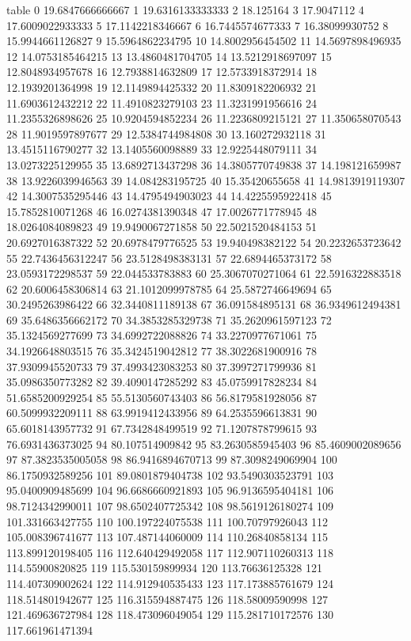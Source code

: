 table {%
0 19.6847666666667
1 19.6316133333333
2 18.125164
3 17.9047112
4 17.6009022933333
5 17.1142218346667
6 16.7445574677333
7 16.38099930752
8 15.9944661126827
9 15.5964862234795
10 14.8002956454502
11 14.5697898496935
12 14.0753185464215
13 13.4860481704705
14 13.5212918697097
15 12.8048934957678
16 12.7938814632809
17 12.5733918372914
18 12.1939201364998
19 12.1149894425332
20 11.8309182206932
21 11.6903612432212
22 11.4910823279103
23 11.3231991956616
24 11.2355326898626
25 10.9204594852234
26 11.2236809215121
27 11.350658070543
28 11.9019597897677
29 12.5384744984808
30 13.160272932118
31 13.4515116790277
32 13.1405560098889
33 12.9225448079111
34 13.0273225129955
35 13.6892713437298
36 14.3805770749838
37 14.198121659987
38 13.9226039946563
39 14.084283195725
40 15.35420655658
41 14.9813919119307
42 14.3007535295446
43 14.4795494903023
44 14.4225595922418
45 15.7852810071268
46 16.0274381390348
47 17.0026771778945
48 18.0264084089823
49 19.9490067271858
50 22.5021520484153
51 20.6927016387322
52 20.6978479776525
53 19.940498382122
54 20.2232653723642
55 22.7436456312247
56 23.5128498383131
57 22.6894465373172
58 23.0593172298537
59 22.044533783883
60 25.3067070271064
61 22.5916322883518
62 20.6006458306814
63 21.1012099978785
64 25.5872746649694
65 30.2495263986422
66 32.3440811189138
67 36.091584895131
68 36.9349612494381
69 35.6486356662172
70 34.3853285329738
71 35.2620961597123
72 35.1324569277699
73 34.6992722088826
74 33.2270977671061
75 34.1926648803515
76 35.3424519042812
77 38.3022681900916
78 37.9309945520733
79 37.4993423083253
80 37.3997271799936
81 35.0986350773282
82 39.4090147285292
83 45.0759917828234
84 51.6585200929254
85 55.5130560743403
86 56.8179581928056
87 60.5099932209111
88 63.9919412433956
89 64.2535596613831
90 65.6018143957732
91 67.7342848499519
92 71.1207878799615
93 76.6931436373025
94 80.107514909842
95 83.2630585945403
96 85.4609002089656
97 87.3823535005058
98 86.9416894670713
99 87.3098249069904
100 86.1750932589256
101 89.0801879404738
102 93.5490303523791
103 95.0400909485699
104 96.6686660921893
105 96.9136595404181
106 98.7124342990011
107 98.6502407725342
108 98.5619126180274
109 101.331663427755
110 100.197224075538
111 100.70797926043
112 105.008396741677
113 107.487144060009
114 110.26840858134
115 113.899120198405
116 112.640429492058
117 112.907110260313
118 114.55900820825
119 115.530159899934
120 113.76636125328
121 114.407309002624
122 114.912940535433
123 117.173885761679
124 118.514801942677
125 116.315594887475
126 118.58009590998
127 121.469636727984
128 118.473096049054
129 115.281710172576
130 117.661961471394
}
